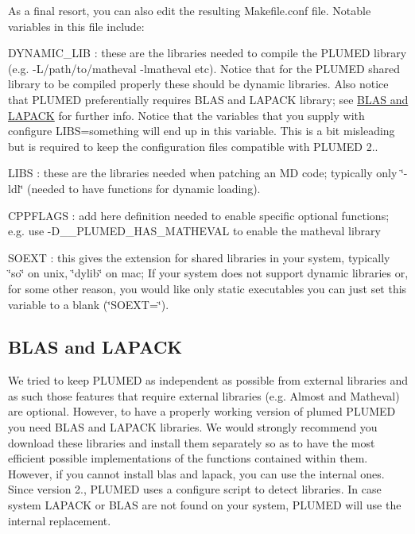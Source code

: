 As a final resort, you can also edit the resulting Makefile.\+conf file. Notable variables in this file include\+:
\begin{DoxyItemize}
\item D\+Y\+N\+A\+M\+I\+C\+\_\+\+L\+I\+B \+: these are the libraries needed to compile the P\+L\+U\+M\+E\+D library (e.\+g. -\/\+L/path/to/matheval -\/lmatheval etc). Notice that for the P\+L\+U\+M\+E\+D shared library to be compiled properly these should be dynamic libraries. Also notice that P\+L\+U\+M\+E\+D preferentially requires B\+L\+A\+S and L\+A\+P\+A\+C\+K library; see \hyperlink{_installation_BlasAndLapack}{B\+L\+A\+S and L\+A\+P\+A\+C\+K} for further info. Notice that the variables that you supply with {\ttfamily configure L\+I\+B\+S=something} will end up in this variable. This is a bit misleading but is required to keep the configuration files compatible with P\+L\+U\+M\+E\+D 2..
\item L\+I\+B\+S \+: these are the libraries needed when patching an M\+D code; typically only \char`\"{}-\/ldl\char`\"{} (needed to have functions for dynamic loading).
\item C\+P\+P\+F\+L\+A\+G\+S \+: add here definition needed to enable specific optional functions; e.\+g. use -\/\+D\+\_\+\+\_\+\+P\+L\+U\+M\+E\+D\+\_\+\+H\+A\+S\+\_\+\+M\+A\+T\+H\+E\+V\+A\+L to enable the matheval library
\item S\+O\+E\+X\+T \+: this gives the extension for shared libraries in your system, typically \char`\"{}so\char`\"{} on unix, \char`\"{}dylib\char`\"{} on mac; If your system does not support dynamic libraries or, for some other reason, you would like only static executables you can just set this variable to a blank (\char`\"{}\+S\+O\+E\+X\+T=\char`\"{}).
\end{DoxyItemize}\hypertarget{_installation_BlasAndLapack}{}\subsection{B\+L\+A\+S and L\+A\+P\+A\+C\+K}\label{_installation_BlasAndLapack}
We tried to keep P\+L\+U\+M\+E\+D as independent as possible from external libraries and as such those features that require external libraries (e.\+g. Almost and Matheval) are optional. However, to have a properly working version of plumed P\+L\+U\+M\+E\+D you need B\+L\+A\+S and L\+A\+P\+A\+C\+K libraries. We would strongly recommend you download these libraries and install them separately so as to have the most efficient possible implementations of the functions contained within them. However, if you cannot install blas and lapack, you can use the internal ones. Since version 2., P\+L\+U\+M\+E\+D uses a configure script to detect libraries. In case system L\+A\+P\+A\+C\+K or B\+L\+A\+S are not found on your system, P\+L\+U\+M\+E\+D will use the internal replacement.

